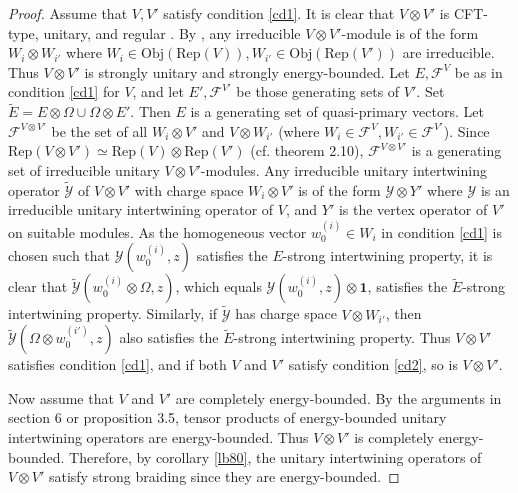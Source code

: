 \documentclass[12pt,a4paper]{article}
\theoremstyle{definition}
\theoremstyle{plain}
\newcommand{\mc}{\mathcal}
\newcommand{\wtd}{\widetilde}
\newcommand{\id}{\mathbf{1}}
\newcommand{\Rep}{\mathrm{Rep}}
\newcommand{\RepV}{\mathrm{Rep}(V)}
\newcommand{\Obj}{\mathrm{Obj}}
\numberwithin{equation}{subsection}
\begin{document}
\begin{proof}
Assume that $V,V'$ satisfy condition \ref{cd1}. It is clear that $V\otimes V'$ is CFT-type, unitary, and regular \cite{DLM97}. By \cite{FHL93}, any irreducible $V\otimes V'$-module is of the form $W_i\otimes W_{i'}$ where $W_i\in\Obj(\RepV),W_{i'}\in\Obj(\Rep(V'))$ are irreducible. Thus $V\otimes V'$ is strongly unitary and strongly energy-bounded. Let $E,\mc F^V$ be as in condition \ref{cd1} for $V$, and let $E',\mc F^{V'}$ be those generating sets of $V'$. Set $\wtd E=E\otimes \Omega\cup\Omega\otimes E'$. Then $E$ is a generating set of quasi-primary vectors. Let $\mc F^{V\otimes V'}$ be the set of all $W_i\otimes V'$ and $V\otimes W_{i'}$ (where $W_i\in\mc F^V,W_{i'}\in \mc F^{V'}$). Since $\Rep(V\otimes V')\simeq \Rep(V)\otimes \Rep(V')$ (cf. \cite{ADL05} theorem 2.10), $\mc F^{V\otimes V'}$ is a generating set of irreducible unitary $V\otimes V'$-modules. Any irreducible unitary intertwining operator $\wtd{\mc Y}$ of $V\otimes V'$ with charge space $W_i\otimes V'$ is of the form $\mc Y\otimes Y'$ where $\mc Y$ is an irreducible unitary intertwining operator of $V$, and $Y'$ is the vertex operator of $V'$ on suitable modules. As the homogeneous vector $w^{(i)}_0\in W_i$ in condition \ref{cd1} is chosen such that $\mc Y(w^{(i)}_0,z)$ satisfies the $E$-strong intertwining property, it is clear that $\wtd {\mc Y}(w^{(i)}_0\otimes\Omega,z)$, which equals $\mc Y(w^{(i)}_0,z)\otimes\id$, satisfies the $\wtd E$-strong intertwining property. Similarly, if $\wtd{\mc Y}$ has charge space $V\otimes W_{i'}$, then $\wtd{\mc Y}(\Omega\otimes w^{(i')}_0,z)$ also satisfies the $\wtd E$-strong intertwining property. Thus $V\otimes V'$ satisfies condition \ref{cd1}, and if both $V$ and $V'$ satisfy condition \ref{cd2}, so is $V\otimes V'$.

Now assume that $V$ and $V'$ are completely energy-bounded. By the arguments in \cite{CKLW18} section 6 or \cite{Gui19a} proposition 3.5, tensor products of energy-bounded unitary intertwining operators are energy-bounded. Thus $V\otimes V'$ is completely energy-bounded. Therefore, by corollary \ref{lb80}, the unitary intertwining operators of $V\otimes V'$ satisfy strong braiding since they are energy-bounded.
\end{proof}
\end{document}
